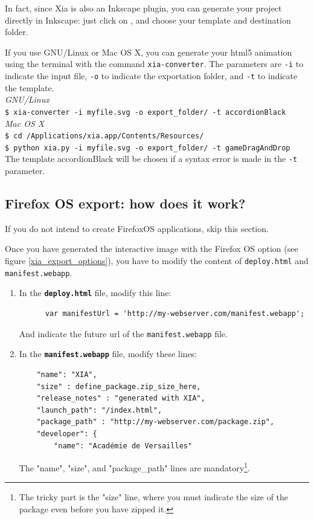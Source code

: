 In fact, since Xia is also an Inkscape plugin, you can generate your project directly 
in Inkscape: just click on , 
and choose your template and destination folder.

\begin{tip}
 If you use GNU/Linux or Mac OS X, you can generate your html5 animation
 using the terminal with the command \texttt{xia-converter}. The parameters are
 \texttt{-i} to indicate the input file, \texttt{-o} to indicate the exportation folder, and
 \texttt{-t} to indicate the template.\\
 \emph{GNU/Linux}\\
 \texttt{\$ xia-converter -i myfile.svg -o export\_folder/ -t accordionBlack}\\
 \emph{Mac OS X}\\
 \texttt{\$ cd /Applications/xia.app/Contents/Resources/}\\
 \texttt{\$ python xia.py -i myfile.svg -o export\_folder/ -t gameDragAndDrop}\\
 The template accordionBlack will be chosen if a syntax error is made in the \texttt{-t} parameter.
\end{tip}

\subsection{Firefox OS export: how does it work?}\label{FirefoxOS}

\begin{alert}
 If you do not intend to create FirefoxOS applications, skip this section.
\end{alert}


Once you have generated the interactive image with the Firefox OS option (see figure \ref{xia_export_options}), you have to modify the content of 
\texttt{deploy.html} and \texttt{manifest.webapp}.

\begin{enumerate}
 \item In the \textbf{\texttt{deploy.html}} file, modify this line:

 \begin{verbatim}
      var manifestUrl = 'http://my-webserver.com/manifest.webapp';
 \end{verbatim}
 
 And indicate the future url of the \texttt{manifest.webapp} file.

 \item  In the \textbf{\texttt{manifest.webapp}} file, modify these lines:
 \begin{verbatim}
    "name": "XIA",
    "size" : define_package.zip_size_here,
    "release_notes" : "generated with XIA", 
    "launch_path": "/index.html",
    "package_path" : "http://my-webserver.com/package.zip",
    "developer": {
        "name": "Académie de Versailles"
 \end{verbatim}

The "name", "size", and "package\_path" lines are mandatory\footnote{The tricky part is the
"size" line, where you must indicate the size of the package even before you 
have zipped it.}.
\end{enumerate}


